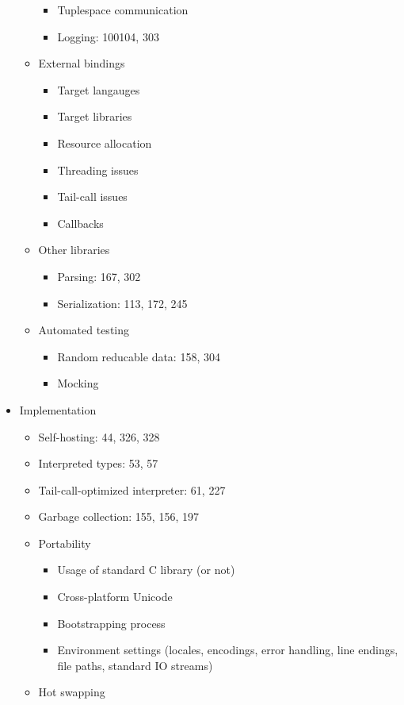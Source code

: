 \begin{itemize}
\begin{itemize}
\begin{itemize}
    \item Tuplespace communication
    \item Logging: 100104, 303
    \end{itemize}
  \item External bindings
    \begin{itemize}
    \item Target langauges
    \item Target libraries
    \item Resource allocation
    \item Threading issues
    \item Tail-call issues
    \item Callbacks
    \end{itemize}
  \item Other libraries
    \begin{itemize}
    \item Parsing: 167, 302
    \item Serialization: 113, 172, 245
    \end{itemize}
  \item Automated testing
    \begin{itemize}
    \item Random reducable data: 158, 304
    \item Mocking
    \end{itemize}
  \end{itemize}
\item Implementation
  \begin{itemize}
  \item Self-hosting: 44, 326, 328
  \item Interpreted types: 53, 57
  \item Tail-call-optimized interpreter: 61, 227
  \item Garbage collection: 155, 156, 197
  \item Portability
    \begin{itemize}
    \item Usage of standard C library (or not)
    \item Cross-platform Unicode
    \item Bootstrapping process
    \item Environment settings (locales, encodings, error handling, line endings, file paths, standard IO streams)
    \end{itemize}
  \item Hot swapping
    \begin{itemize}

\end{itemize}
\end{itemize}
\end{itemize}
